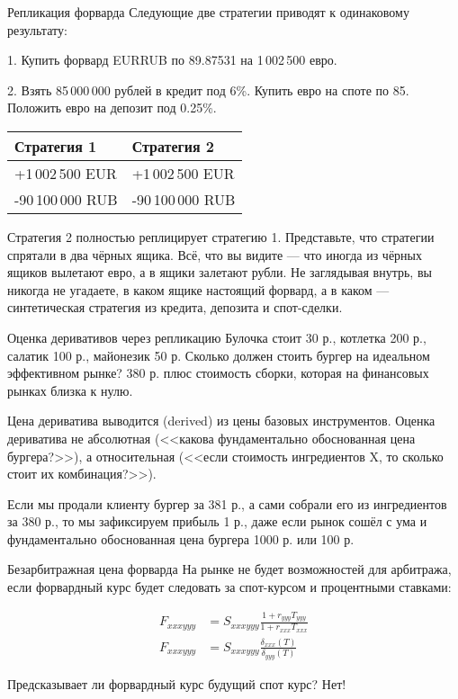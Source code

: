 \documentclass{beamer}
\begin{document}
\begin{frame}{Репликация форварда}
\justify
Следующие две стратегии приводят к одинаковому результату:

1. Купить форвард EURRUB по 89.87531 на 1\,002\,500 евро.

2. Взять 85\,000\,000 рублей в кредит под 6\%. Купить евро на споте по 85. Положить евро на депозит под 0.25\%.

\justify
\centering
\begin{tabular}{l|l}
Стратегия 1       & Стратегия 2 \\ \hline
+1\,002\,500 EUR  & +1\,002\,500 EUR \\
-90\,100\,000 RUB & -90\,100\,000 RUB
\end{tabular}

\justify
Стратегия 2 полностью \alert{реплицирует} стратегию 1. Представьте, что стратегии спрятали в два чёрных ящика. Всё, что вы видите --- что иногда из чёрных ящиков вылетают евро, а в ящики залетают рубли. Не заглядывая внутрь, вы никогда не угадаете, в каком ящике настоящий форвард, а в каком --- синтетическая стратегия из кредита, депозита и спот-сделки.
\end{frame}



\begin{frame}{Оценка деривативов через репликацию}
\justify
Булочка стоит 30 р., котлетка 200 р., салатик 100 р., майонезик 50 р. Сколько должен стоить бургер на идеальном эффективном рынке? 380 р. плюс стоимость сборки, которая на финансовых рынках близка к нулю.

\justify
Цена дериватива выводится (derived) из цены базовых инструментов. Оценка дериватива
не абсолютная (<<какова фундаментально обоснованная цена бургера?>>), а относительная (<<если стоимость ингредиентов X, то сколько стоит их комбинация?>>).

\justify
Если мы продали клиенту бургер за 381 р., а сами собрали его из ингредиентов за 380 р., то мы зафиксируем прибыль 1 р., даже если рынок сошёл с ума и фундаментально обоснованная цена бургера 1000 р. или 100 р.
\end{frame}



\begin{frame}{Безарбитражная цена форварда}
\justify
На рынке не будет возможностей для арбитража, если форвардный курс будет следовать за спот-курсом и процентными ставками:

\begin{align*}
F_{xxxyyy} &= S_{xxxyyy} \frac{1 + r_{yyy}T_{yyy}}{1 + r_{xxx}T_{xxx}} \\
F_{xxxyyy} &= S_{xxxyyy} \frac{\delta_{xxx}(T)}{\delta_{yyy}(T)}
\end{align*}

\justify
Предсказывает ли форвардный курс будущий спот курс? Нет!
\end{frame}
\end{document}
